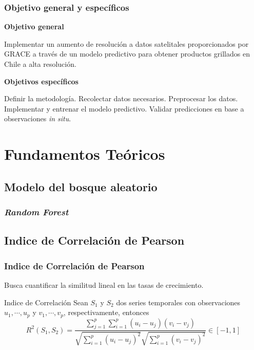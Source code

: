 \documentclass{beamer}
\begin{document}
  \begin{frame}
    \frametitle{Objetivo general y específicos}

    \large\textbf{Objetivo general}
    \begin{outline}
      \1 Implementar un aumento de resolución a datos satelitales proporcionados por GRACE a través de un modelo
      predictivo para obtener productos grillados en Chile a alta resolución.
    \end{outline}

    \large\textbf{Objetivos específicos} 
    \begin{outline}
      \1 Definir la metodología.
      \1 Recolectar datos necesarios.
      \1 Preprocesar los datos.
      \1 Implementar y entrenar el modelo predictivo.
      \1 Validar predicciones en base a observaciones \textit{in situ}.
    \end{outline}

  \end{frame}

  \section{Fundamentos Teóricos}

  \subsection*{Modelo del bosque aleatorio}

  \begin{frame}
    \frametitle{\textit{Random Forest}}

    \begin{outline}
      \1 
    \end{outline}
  \end{frame}

  \subsection*{Indice de Correlación de Pearson}

  \begin{frame}
    \frametitle{Indice de Correlación de Pearson}

    \begin{outline}
      \1 Busca cuantificar la similitud lineal en las tasas de crecimiento.
    \end{outline}

    \begin{block}{Indice de Correlación}
      Sean $ S_1 $ y $ S_2 $ dos series temporales con observaciones $ u_1,\cdots, u_p $ y $ v_1,\cdots,v_p $, respectivamente, entonces
      $$ R^2(S_1,S_2) = \frac{\sum_{j=1}^p\sum_{i=1}^p(u_i-u_j)(v_i-v_j)} {\sqrt{\sum_{i=1}^p(u_i-u_j)^2}\sqrt{\sum_{i=1}^p(v_i-v_j)^2}} \in [-1,1]$$
    \end{block}

  \end{frame}
\end{document}
